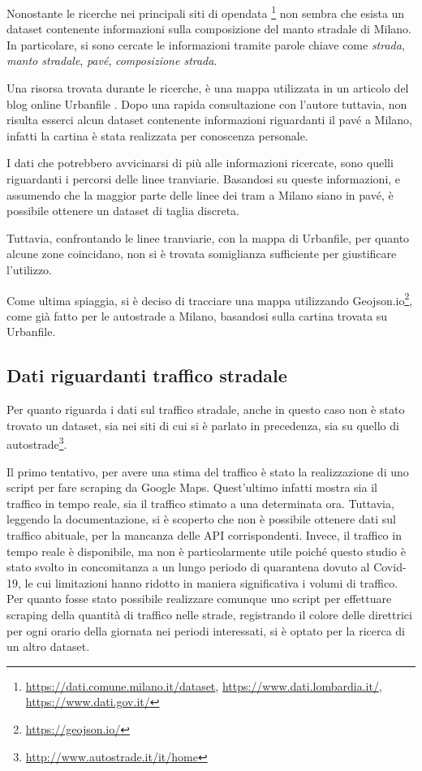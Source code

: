 \documentclass[a4paper,12pt]{report}
\newcommand{\quotestyle}[1]{\textit{#1}}
\begin{document}
Nonostante le ricerche nei principali siti di opendata
\footnote{
    \url{https://dati.comune.milano.it/dataset}, 
    \url{https://www.dati.lombardia.it/},
    \url{https://www.dati.gov.it/}}
non sembra che esista un dataset contenente informazioni sulla composizione del 
manto stradale di Milano. 
In particolare, si sono cercate le informazioni tramite parole chiave come 
\quotestyle{strada}, \quotestyle{manto stradale}, \quotestyle{pavé}, 
\quotestyle{composizione strada}. 

Una risorsa trovata durante le ricerche, è una mappa utilizzata in un articolo del blog online 
Urbanfile \cite{URBANFILE:1}. 
Dopo una rapida consultazione con l'autore tuttavia, non risulta esserci alcun 
dataset contenente informazioni riguardanti il pavé a Milano, infatti la cartina è 
stata realizzata per conoscenza personale. 

I dati che potrebbero avvicinarsi di più alle informazioni ricercate, 
sono quelli riguardanti i percorsi delle linee tranviarie. 
Basandosi su queste informazioni, e assumendo che la maggior parte delle linee dei 
tram a Milano siano in pavé, è possibile ottenere un dataset di taglia discreta. 

Tuttavia, confrontando le linee tranviarie, con la mappa di Urbanfile, 
per quanto alcune zone coincidano, non si è trovata 
somiglianza sufficiente per giustificare l'utilizzo. 

Come ultima spiaggia, si è deciso di tracciare una mappa utilizzando 
Geojson.io\footnote{\url{https://geojson.io/}}, come già fatto per le autostrade a Milano, 
basandosi sulla cartina trovata su Urbanfile. 

\subsection{Dati riguardanti traffico stradale}

Per quanto riguarda i dati sul traffico stradale, anche in questo caso non è stato trovato un 
dataset, sia nei siti di cui si è parlato in precedenza, sia su quello di 
autostrade\footnote{\url{http://www.autostrade.it/it/home}}. 

Il primo tentativo, per avere una stima del traffico è stato la realizzazione di uno 
script per fare scraping da Google Maps. 
Quest'ultimo infatti mostra sia il traffico in tempo reale, sia 
il traffico stimato a una determinata ora. 
Tuttavia, leggendo la documentazione, si è scoperto che non è possibile ottenere 
dati sul traffico abituale, per la mancanza delle API corrispondenti. 
Invece, il traffico in tempo reale è disponibile, ma non è particolarmente utile 
poiché questo studio è stato svolto in concomitanza a un lungo periodo di quarantena 
dovuto al Covid-19, le cui limitazioni hanno ridotto in maniera significativa 
i volumi di traffico. 
Per quanto fosse stato possibile realizzare comunque uno script per effettuare 
scraping della quantità di traffico nelle strade, registrando il colore delle 
direttrici per ogni orario della giornata nei periodi interessati, si è 
optato per la ricerca di un altro dataset. 
\end{document}
